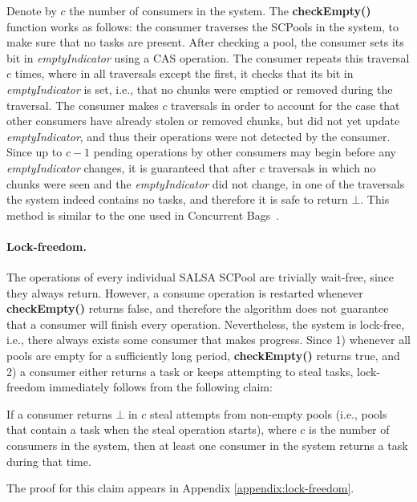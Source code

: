 Denote by $c$ the number of consumers in the system. The {\bf checkEmpty()} function works as follows: the consumer traverses the SCPools in the system, to make sure that no tasks are present. After checking a pool, the consumer sets its bit in \emph{emptyIndicator} using a CAS operation. The consumer repeats this traversal $c$ times, where in all traversals except the first, it checks that its bit in \emph{emptyIndicator} is set, i.e., that no chunks were emptied or removed during the traversal. The consumer makes $c$ traversals in order to account for the case that other consumers have already stolen or removed chunks, but did not yet update \emph{emptyIndicator}, and thus their operations were not detected by the consumer. Since up to $c-1$ pending operations by other consumers may begin before any \emph{emptyIndicator} changes, it is guaranteed that after $c$ traversals in which no chunks were seen and the \emph{emptyIndicator} did not change, in one of the traversals the system indeed contains no tasks, and therefore it is safe to return $\bot$. This method is similar to the one used in Concurrent Bags~\cite{Sundell:2011:LAC:1989493.1989550}.
\paragraph{Lock-freedom.}
The operations of every individual SALSA SCPool are trivially wait-free, since they always return. However, a consume operation is restarted whenever {\bf checkEmpty()} returns false, and therefore the algorithm does not guarantee that a consumer will finish every operation. Nevertheless, the system is lock-free, i.e., there always exists some consumer that makes progress. Since 1) whenever all pools are empty for a sufficiently long period, {\bf checkEmpty()} returns true, and 2) a consumer either returns a task or keeps attempting to steal tasks, lock-freedom immediately follows from the following claim:

\begin{claim}
\label{claim:lock-free}
If a consumer returns $\bot$ in $c$ steal attempts from non-empty pools (i.e., pools that contain a task when the steal operation starts), where $c$ is the number of consumers in the system, then at least one consumer in the system returns a task during that time. 
\end{claim}
The proof for this claim appears in Appendix \ref{appendix:lock-freedom}.